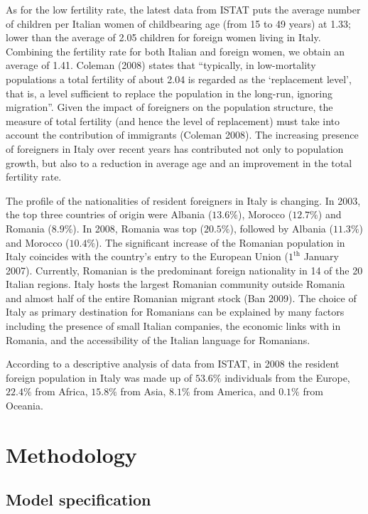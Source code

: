 \documentclass[10pt] {article}
\theoremstyle{definition}
\theoremstyle{plain}
\begin{document}
As for the low fertility rate, the latest data from ISTAT puts the average number of children per Italian women of childbearing age (from 15 to 49 years) at 1.33; lower than the average of 2.05 children for foreign women living in Italy. Combining the fertility rate for both Italian and foreign women, we obtain an average of 1.41. Coleman (2008) states that ``typically, in low-mortality populations a total fertility of about 2.04 is regarded as the `replacement level', that is, a level sufficient to replace the population in the long-run, ignoring migration''. Given the impact of foreigners on the population structure, the measure of total fertility (and hence the level of replacement) must take into account the contribution of immigrants (Coleman 2008). The increasing presence of foreigners in Italy over recent years has contributed not only to population growth, but also to a reduction in average age and an improvement in the total fertility rate.

The profile of the nationalities of resident foreigners in Italy is changing. In 2003, the top three countries of origin were Albania ($13.6\%$), Morocco ($12.7\%$) and Romania ($8.9\%$). In 2008, Romania was top ($20.5\%$), followed by Albania ($11.3\%$) and Morocco ($10.4\%$). The significant increase of the Romanian population in Italy coincides with the country's entry to the European Union ($1^\text{th}$ January 2007). Currently, Romanian is the predominant foreign nationality in 14 of the 20 Italian regions. Italy hosts the largest Romanian community outside Romania and almost half of the entire Romanian migrant stock (Ban 2009). The choice of Italy as primary destination for Romanians can be explained by many factors including the presence of small Italian companies, the economic links with in Romania, and the accessibility of the Italian language for Romanians. 

According to a descriptive analysis of data from ISTAT, in 2008 the resident foreign population in Italy was made up of $53.6\%$ individuals from the Europe, $22.4\%$ from Africa, $15.8\%$ from Asia, $8.1\%$ from America, and $0.1\%$ from Oceania.

\section{Methodology \label{METH}}

\subsection{Model specification \label{MS}}
\end{document}
